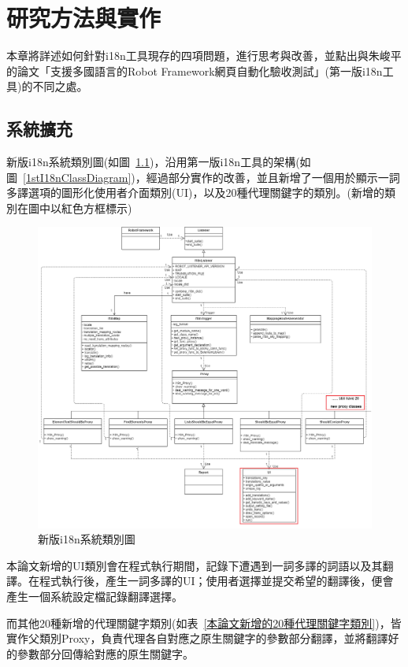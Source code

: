 \chapter{研究方法與實作}
本章將詳述如何針對i18n工具現存的四項問題，進行思考與改善，並點出與朱峻平的論文「支援多國語言的Robot Framework網頁自動化驗收測試」(第一版i18n工具)的不同之處。

\section{系統擴充}
新版i18n系統類別圖(如圖~\ref{新版i18n系統類別圖})，沿用第一版i18n工具的架構(如圖~\ref{1stI18nClassDiagram})，經過部分實作的改善，並且新增了一個用於顯示一詞多譯選項的圖形化使用者介面類別(UI)，以及20種代理關鍵字的類別。(新增的類別在圖中以紅色方框標示)

\begin{figure}[H]
\flushleft
\includegraphics[width= 180mm]{../UML/i18n class diagram-i18n class diagram.png}
\caption{新版i18n系統類別圖}
\label{新版i18n系統類別圖}
\end{figure}

本論文新增的UI類別會在程式執行期間，記錄下遭遇到一詞多譯的詞語以及其翻譯。在程式執行後，產生一詞多譯的UI；使用者選擇並提交希望的翻譯後，便會產生一個系統設定檔記錄翻譯選擇。

而其他20種新增的代理關鍵字類別(如表~\ref{本論文新增的20種代理關鍵字類別})，皆實作父類別Proxy，負責代理各自對應之原生關鍵字的參數部分翻譯，並將翻譯好的參數部分回傳給對應的原生關鍵字。

